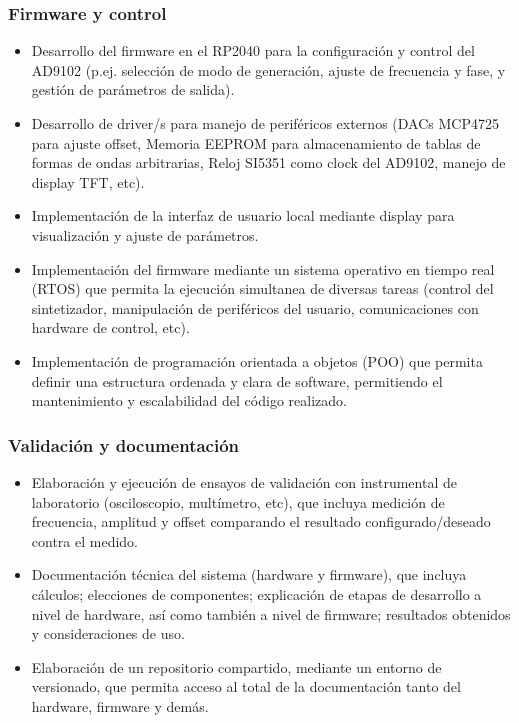 \subsubsection{Firmware y control}
\begin{itemize}
	\item Desarrollo del firmware en el RP2040 para la configuración y control del AD9102 (p.ej. selección de modo de generación, ajuste de frecuencia y fase, y gestión de parámetros de salida).
	
	\item Desarrollo de driver/s para manejo de periféricos externos (DACs MCP4725 para ajuste offset, Memoria EEPROM para almacenamiento de tablas de formas de ondas arbitrarias, Reloj SI5351 como clock del AD9102, manejo de display TFT, etc).
	
	\item Implementación de la interfaz de usuario local mediante display para visualización y ajuste de parámetros.
		
	\item Implementación del firmware mediante un sistema operativo en tiempo real (RTOS) que permita la ejecución simultanea de diversas tareas (control del sintetizador, manipulación de periféricos del usuario, comunicaciones con hardware de control, etc).
	
	\item Implementación de programación orientada a objetos (POO) que permita definir una estructura ordenada y clara de software, permitiendo el mantenimiento y escalabilidad del código realizado.
\end{itemize}

\subsubsection{Validación y documentación}
\begin{itemize}
	\item Elaboración y ejecución de ensayos de validación con instrumental de laboratorio (osciloscopio, multímetro, etc), que incluya medición de frecuencia, amplitud y offset comparando el resultado configurado/deseado contra el medido.
	
	
	\item Documentación técnica del sistema (hardware y firmware), que incluya cálculos; elecciones de componentes; explicación de etapas de desarrollo a nivel de hardware, así como también a nivel de firmware; resultados obtenidos y consideraciones de uso.
	
	\item Elaboración de un repositorio compartido, mediante un entorno de versionado, que permita acceso al total de la documentación tanto del hardware, firmware y demás.
\end{itemize}

